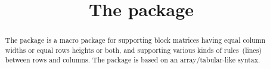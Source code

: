 \documentclass[a4paper,final,11pt]{article}
\title{The package \package{easybmat}}
\begin{document}
\maketitle
\begin{abstract}
  The 
  package is a macro package for supporting block matrices
  having equal column widths or equal rows heights or both,
  and supporting various kinds of rules~(lines) between rows and columns.
  The package is based on an array/ta\-bular-like syntax.       
\end{abstract}


\tableofcontents
\clearpage

\pagestyle{fpage}
\def\sectionmark#1{\markboth{The package \package{easybmat}}{The package \package{easybmat}}}
\let\chaptermark\sectionmark
\let\subsectionmark\sectionmark
\end{document}
